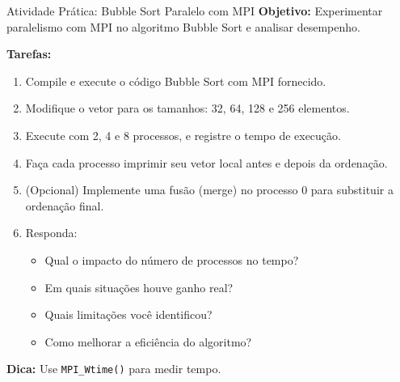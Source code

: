 \documentclass{beamer}
\begin{document}
\begin{frame}{Atividade Prática: Bubble Sort Paralelo com MPI}
\textbf{Objetivo:} Experimentar paralelismo com MPI no algoritmo Bubble Sort e analisar desempenho.

\vspace{0.5em}
\textbf{Tarefas:}
\begin{enumerate}
    \item Compile e execute o código Bubble Sort com MPI fornecido.
    \item Modifique o vetor para os tamanhos: 32, 64, 128 e 256 elementos.
    \item Execute com 2, 4 e 8 processos, e registre o tempo de execução.
    \item Faça cada processo imprimir seu vetor local antes e depois da ordenação.
    \item (Opcional) Implemente uma fusão (merge) no processo 0 para substituir a ordenação final.
    \item Responda:
    \begin{itemize}
        \item Qual o impacto do número de processos no tempo?
        \item Em quais situações houve ganho real?
        \item Quais limitações você identificou?
        \item Como melhorar a eficiência do algoritmo?
    \end{itemize}
\end{enumerate}

\vspace{0.5em}
\textbf{Dica:} Use \texttt{MPI\_Wtime()} para medir tempo.
\end{frame}
\end{document}
